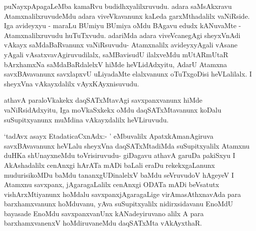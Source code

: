 \begin{artha}
puNayxpApagaLeMba kamaRvu budidhxyalilxruvudu. adara saMsAkxravu AtamxnalilxruvudeMdu adara viveVkavanunx kaLeda garxMthadalilx vaNiRside. Iga avideyxyu - maraLu BUmiyu BUmiya oMdu BAgavu edudx kANuvaMte - Atamxnalilxruvudu huTuTxvudu. adariMda adara viveVcanegAgi sheyxVnAdi vAkayx saMdaBaRvanunx vaNiRsuvudu- Atamxnalilx avideyxyAgali vAsane yAgali vAsatxvavAgiruvudilalx, saMBavisudU ilalxveMdu mUtARmUtaR bArxhamxNa saMdaBaRdalelxV hiMde heVLidAdxyitu, AdarU Atamxna savxBAvavanunx savxlapxvU uLiyadaMte elalxvanunx oTuTxgoDisi heVLalilalx. I sheyxVna vAkayxdalilx vAyxKAyxnisuvudu. 
\end{artha}

\begin{artha}
athavA paraloVkakekx daqSATxMtavAgi savxpanxvanunx hiMde vaNiRsidAdxyitu,
Iga moVkaSxkekx oMdu daqSATxMtavanunx koDalu suSupitxyanunx muMdina vAkayxdalilx heVLiruvudu.
\end{artha}


\begin{artha}
`tadAvx asayx EtadaticaCxnAdx:- ' eMbuvalilx ApatxkAmanAgiruva savxBAvavanunx heVLalu sheyxVna daqSATxMtadiMda suSupitxyalilx Atamxnu duHKa shUnayxneMdu toVrisiruvudu- giDagavu athavA garuDa pakiSxyu I AkAshadalilx cenAnxgi hArATa mADi baLali eraDu rekekxgaLanunx mudurisikoMDu baMdu tananxgUDinalelxV baMdu seVruvudoV hAgeyeV I Atamxnu savxpanx, jAgaragaLalilx cenAnxgi ODATa mADi beVsatutx vishArxMtiyanunx hoMdalu savxpanxjAgaragaLige virAmasAthxnavAda para barxhamxvanunx hoMduvanu, yAva suSupitxyalilx nidirxsidavanu EnoMdU bayasade EnoMdu savxpanxvanUnx kANadeyiruvano alilx A para barxhamxvanenxV hoMdiruvaneMdu daqSATxMta vAkAyxthaR. 
\end{artha}%

